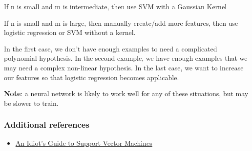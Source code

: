 If n is small and m is intermediate, then use SVM with a Gaussian Kernel

If n is small and m is large, then manually create/add more features, then use logistic regression or SVM without a kernel.

In the first case, we don't have enough examples to need a complicated polynomial hypothesis. In the second example, we have enough examples that we may need a complex non-linear hypothesis. In the last case, we want to increase our features so that logistic regression becomes applicable.

\textbf{Note}: a neural network is likely to work well for any of these situations, but may be slower to train.

\subsubsection{Additional references}
\begin{itemize}
\item \href{http://web.mit.edu/6.034/wwwbob/svm-notes-long-08.pdf}{An Idiot's Guide to Support Vector Machines}
\end{itemize}